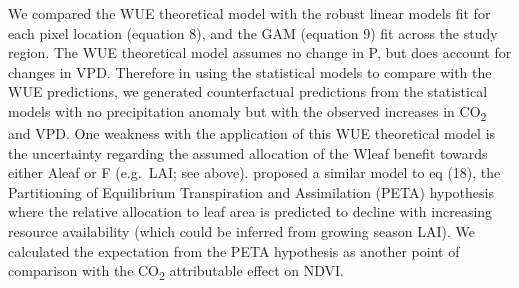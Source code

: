 \documentclass[gc, manuscript]{copernicus}
\begin{document}
We compared the WUE theoretical model with the robust linear models fit
for each pixel location (equation 8), and the GAM (equation 9) fit
across the study region. The WUE theoretical model assumes no change in
P, but does account for changes in VPD. Therefore in using the
statistical models to compare with the WUE predictions, we generated
counterfactual predictions from the statistical models with no
precipitation anomaly but with the observed increases in
CO\textsubscript{2} and VPD. One weakness with the application of this
WUE theoretical model is the uncertainty regarding the assumed
allocation of the Wleaf benefit towards either Aleaf or F (e.g.~LAI; see
above). \citep{donohue_etal17} proposed a similar model to eq (18), the
Partitioning of Equilibrium Transpiration and Assimilation (PETA)
hypothesis where the relative allocation to leaf area is predicted to
decline with increasing resource availability (which could be inferred
from growing season LAI). We calculated the expectation from the PETA
hypothesis as another point of comparison with the CO\textsubscript{2}
attributable effect on NDVI.
\end{document}
